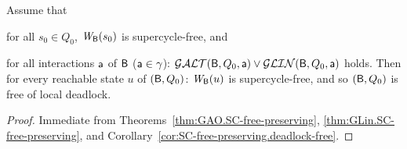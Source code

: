 \begin{corollary}  
\label{theorem:global.deadlock-free}
Assume that
\bn
\item \label{theorem:global.deadlock-free.initial}
      for all $s_0 \in Q_0$, $\mathit{W}_{\mathsf{B}}({s_0})$ is supercycle-free, and
\item \label{theorem:global.deadlock-free.scfPres}
      for all interactions $\mathsf{a}$ of $\mathsf{B}$ (\ie $\mathsf{a} \in \gamma$):  $\mathcal{GALT}(\mathsf{B}, Q_0, \mathsf{a}) \lor \mathcal{GLIN}(\mathsf{B}, Q_0, \mathsf{a})$ holds.
\en
Then for every reachable state $u$ of $(\mathsf{B}, Q_0)$:  $\mathit{W}_{\mathsf{B}}({u})$ is supercycle-free, and so 
$(\mathsf{B}, Q_0)$ is free of local deadlock.
\end{corollary}
%
\begin{proof}
Immediate from Theorems~\ref{thm:GAO.SC-free-preserving}, \ref{thm:GLin.SC-free-preserving}, and Corollary~\ref{cor:SC-free-preserving.deadlock-free}.
\end{proof}





